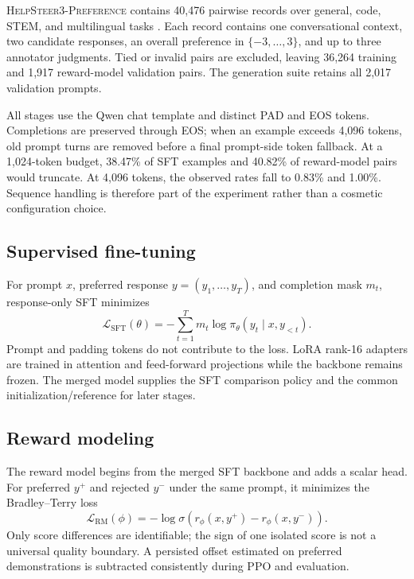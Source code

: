 \documentclass[10pt,twocolumn]{article}
\newcommand{\dataset}{\textsc{HelpSteer3-Preference}}
\begin{document}
\dataset{} contains 40,476 pairwise records over general, code, STEM, and
multilingual tasks \cite{wang2025}. Each record contains one conversational
context, two candidate responses, an overall preference in
$\{-3,\ldots,3\}$, and up to three annotator judgments. Tied or invalid pairs
are excluded, leaving 36,264 training and 1,917 reward-model validation pairs.
The generation suite retains all 2,017 validation prompts.

All stages use the Qwen chat template and distinct PAD and EOS tokens.
Completions are preserved through EOS; when an example exceeds 4,096 tokens,
old prompt turns are removed before a final prompt-side token fallback. At a
1,024-token budget, 38.47\% of SFT examples and 40.82\% of reward-model pairs
would truncate. At 4,096 tokens, the observed rates fall to 0.83\% and 1.00\%.
Sequence handling is therefore part of the experiment rather than a cosmetic
configuration choice.

\subsection{Supervised fine-tuning}

For prompt $x$, preferred response $y=(y_1,\ldots,y_T)$, and completion mask
$m_t$, response-only SFT minimizes
\begin{equation}
\mathcal{L}_{\mathrm{SFT}}(\theta)
=-\sum_{t=1}^{T}m_t\log\pi_\theta(y_t\mid x,y_{<t}).
\label{eq:sft}
\end{equation}
Prompt and padding tokens do not contribute to the loss. LoRA
\cite{hu2022} rank-16 adapters are trained in attention and feed-forward
projections while the backbone remains frozen. The merged model supplies the
SFT comparison policy and the common initialization/reference for later
stages.

\subsection{Reward modeling}

The reward model begins from the merged SFT backbone and adds a scalar head.
For preferred $y^+$ and rejected $y^-$ under the same prompt, it minimizes the
Bradley--Terry loss
\begin{equation}
\mathcal{L}_{\mathrm{RM}}(\phi)
=-\log\sigma\!\left(r_\phi(x,y^+)-r_\phi(x,y^-)\right).
\label{eq:rm}
\end{equation}
Only score differences are identifiable; the sign of one isolated score is
not a universal quality boundary. A persisted offset estimated on preferred
demonstrations is subtracted consistently during PPO and evaluation.
\end{document}
